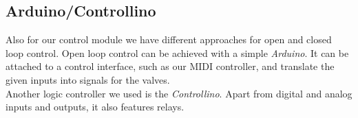 \subsection{Arduino/Controllino}
Also for our control module we have different approaches for open and closed loop control. Open loop control can be achieved with a simple \textit{Arduino}. It can be attached to a control interface, such as our MIDI controller, and translate the given inputs into signals for the valves.\\
Another logic controller we used is the \textit{Controllino}. Apart from digital and analog inputs and outputs, it also features relays.
